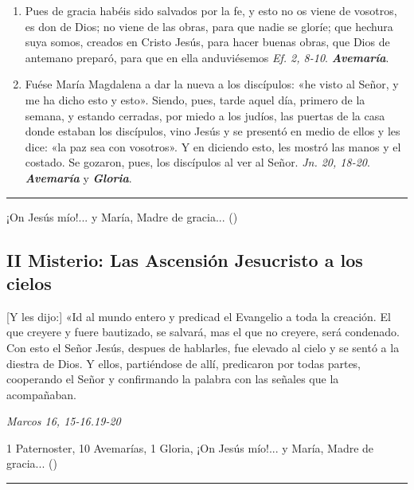 \documentclass[./rosary.tex]{subfiles}
\begin{document}
\begin{enumerate}
    \item Pues de gracia habéis sido salvados por la fe, y esto no os viene de vosotros, es don de Dios; no viene de las obras, para que nadie se gloríe; que hechura suya somos,
          creados en Cristo Jesús, para hacer buenas obras, que Dios de antemano preparó, para que en ella anduviésemos \emph{Ef. 2, 8-10}. \textbf{\emph{Avemaría}}.

    \item Fuése María Magdalena a dar la nueva a los discípulos: «he visto al Señor, y me ha dicho esto y esto». Siendo, pues, tarde aquel día, primero de la semana, y estando cerradas,
          por miedo a los judíos, las puertas de la casa donde estaban los discípulos, vino Jesús y se presentó en medio de ellos y les dice: «la paz sea con vosotros». Y en diciendo esto,
          les mostró las manos y el costado. Se gozaron, pues, los discípulos al ver al Señor. \emph{Jn. 20, 18-20}. \textbf{\emph{Avemaría}} y \textbf{\emph{Gloria}}.
\end{enumerate}

\rule{\textwidth}{0.5pt}
¡On Jesús mío!... y María, Madre de gracia... ()

\subsection*{II Misterio: Las Ascensión Jesucristo a los cielos}

[Y les dijo:] «Id al mundo entero y predicad el Evangelio a toda la creación. El que creyere y fuere bautizado,
se salvará, mas el que no creyere, será condenado. Con esto el Señor Jesús, despues de hablarles,
fue elevado al cielo y se sentó a la diestra de Dios. Y ellos, partiéndose de allí,
predicaron por todas partes, cooperando el Señor y confirmando la palabra con las señales que la acompañaban.

\begin{flushright}
    \emph{Marcos 16, 15-16.19-20}
\end{flushright}

1 Paternoster, 10 Avemarías, 1 Gloria, ¡On Jesús mío!... y María, Madre de gracia... ()

\rule{\textwidth}{0.5pt}
\end{document}

